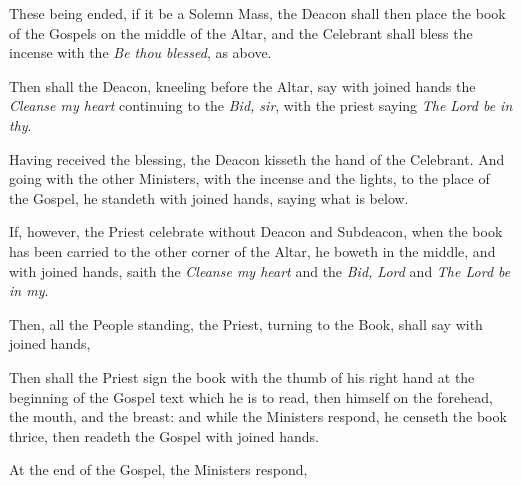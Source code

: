 \begin{multicols}{2}
\begin{rubric}
    These being ended, if it be a Solemn Mass, the Deacon shall then place the book of the Gospels on the middle of the Altar, and the Celebrant shall bless the incense with the \emph{Be thou blessed}, as above.
\end{rubric}
\begin{rubric}
	Then shall the Deacon, kneeling before the Altar, say with joined hands the \emph{Cleanse my heart} continuing to the \emph{Bid, sir}, with the priest saying \emph{The Lord be in thy}.
\end{rubric}
\begin{rubric}
    Having received the blessing, the Deacon kisseth the hand of the Celebrant. And going with the other Ministers, with the incense and the lights, to the place of the Gospel, he standeth with joined hands, saying what is below.
\end{rubric}
\begin{rubric}
    If, however, the Priest celebrate without Deacon and Subdeacon, when the book has been carried to the other corner of the Altar, he boweth in the middle, and with joined hands, saith the \emph{Cleanse my heart} and the \emph{Bid, Lord} and \emph{The Lord be in my}.
\end{rubric}
\end{multicols}
\begin{rubric}
	Then, all the People standing, the Priest, turning to the Book, shall say with joined hands,
\end{rubric}
\begin{rubric}
    Then shall the Priest sign the book with the thumb of his right hand at the beginning of the Gospel text which he is to read, then himself on the forehead, the mouth, and the breast: and while the Ministers respond, he censeth the book thrice, then readeth the Gospel with joined hands.
\end{rubric}
\begin{rubric}
    At the end of the Gospel, the Ministers respond,
\end{rubric}
